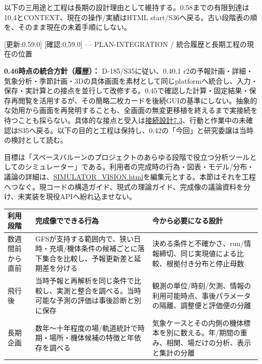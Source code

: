 \documentclass[11pt,a4paper]{article}
\newcounter{none}
\begin{document}
以下の三用途と工程は長期の設計理由として維持する。0.58までの有限到達は10.4とCONTEXT、現在の操作/実績はHTML
start/S36へ戻る。古い段階表の順を、そのまま現在の未着手順にしない。

{[}更新:0.59.0{]} {[}確認:0.59.0{]} --- PLAN-INTEGRATION /
統合履歴と長期工程の現在の位置

\textbf{0.46時点の統合方針（履歴）：} D-185/S35に従い、0.40.1
r2の予報計画・詳細・気象分析・季節計画・3Dの具体画面を素材として同じplatformへ統合し、入力・保存・実計算との接点を並行して改修する。0.45で確認した計算・固定結果・保存再閲覧を活用するが、その簡略二枚カードを後続GUIの基準にしない。抽象的な効用から画面を再発明することも、全画面の無変更移植を終えるまで実接続を待つことも採らない。具体的な接点と受入は\href{INTEGRATION_DESIGN.html\#gui-integration460}{接続設計7.3}、行動と作業中の未確認はS35へ戻る。以下の目的と工程は保持し、0.42の「今回」と研究委譲は当時の検討として読む。

目標は「スペースバルーンのプロジェクトのあらゆる段階で役立つ分析ツールとしてのシミュレーター」である。利用者の完成時の行為・図表・モデル/分布・議論の詳細は、\url{SIMULATOR_VISION.html}を編集元とする。本節はそれを工程へつなぐ。現コードの構造ガイド、現式の理論ガイド、完成像の議論資料を分け、未実装を現役APIへ紛れ込ませない。

{\def\LTcaptype{none} %
\begin{longtable}[]{@{}
  >{\raggedright\arraybackslash}p{}
  >{\raggedright\arraybackslash}p{}
  >{\raggedright\arraybackslash}p{}@{}}
\toprule\noalign{}
\begin{minipage}[b]{\linewidth}\raggedright
利用段階
\end{minipage} & \begin{minipage}[b]{\linewidth}\raggedright
完成像でできる行為
\end{minipage} & \begin{minipage}[b]{\linewidth}\raggedright
今から必要になる設計
\end{minipage} \\
\midrule\noalign{}
\endhead
\bottomrule\noalign{}
\endlastfoot
数週間前から直前 &
GFSが支持する範囲内で、狭い日時・充填/機体条件の候補ごとに落下集合を比較し、予報更新差と延期差を分ける
&
決める条件と不確かさ、run/情報締切、同じ実現値による比較、根拠付き分布と停止母数 \\
飛行後 &
当時予報と再解析を同じ条件で比較し、実測と整合を調べる。当時可能な予測の評価は事後診断と別に保存
&
観測の単位/時刻/欠測、情報の利用可能時点、事後パラメータの隔離、調整便と評価便の分離 \\
長期企画 &
数年〜十年程度の場/軌道統計で時期・場所・機体候補の特徴と年依存を調べる
&
気象ケースとその内側の機体標本を別に数える。年/期間の重み、相関、場だけの分析、表示と集計の分離 \\
\end{longtable}
}
\end{document}
